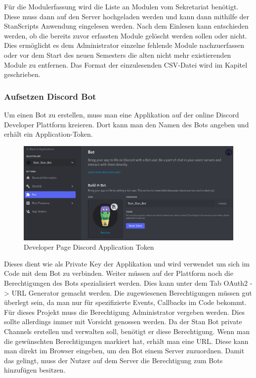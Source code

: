 \documentclass[a4paper, table]{article}
\begin{document}
Für die Modulerfassung wird die Liste an Modulen vom Sekretariat benötigt.
Diese muss dann auf den Server hochgeladen werden und kann dann mithilfe der StanScripts Anwendung eingelesen werden.
Nach dem Einlesen kann entschieden werden, ob die bereits zuvor erfassten Module gelöscht werden sollen oder nicht.
Dies ermöglicht es dem Administrator einzelne fehlende Module nachzuerfassen oder vor dem Start des neuen Semesters die alten nicht mehr existierenden Module zu entfernen.
Das Format der einzulesenden \gls{CSV}-Datei wird im Kapitel  geschrieben.

\subsubsection{Aufsetzen Discord Bot}
Um einen Bot zu erstellen, muss man eine Applikation auf der online Discord Developer Plattform kreieren.
Dort kann man den Namen des Bots angeben und erhält ein Application-Token.
\begin{figure}[h]
    \centering
    \includegraphics[width=1\textwidth]{img/discord_developer_bot.png}
    \caption{Developer Page Discord Application Token}
    \label{fig:delevoper-application-token}
\end{figure}
Dieses dient wie als Private Key der Applikation und wird verwendet um sich im Code mit dem Bot zu verbinden.
Weiter müssen auf der Plattform noch die Berechtigungen des Bots spezialisiert werden.
Dies kann unter dem Tab OAuth2 -> URL Generator gemacht werden.
Die zugewiesenen Berechtigungen müssen gut überlegt sein, da man nur für spezifizierte Events, Callbacks im Code bekommt.
Für dieses Projekt muss die Berechtigung Administrator vergeben werden.
Dies sollte allerdings immer mit Vorsicht genossen werden.
Da der Stan Bot private Channels erstellen und verwalten soll, benötigt er diese Berechtigung.
Wenn man die gewünschten Berechtigungen markiert hat, erhält man eine URL.
Diese kann man direkt im Browser eingeben, um den Bot einem Server zuzuordnen.
Damit das gelingt, muss der Nutzer auf dem Server die Berechtigung zum Bots hinzufügen besitzen. 
\end{document}
